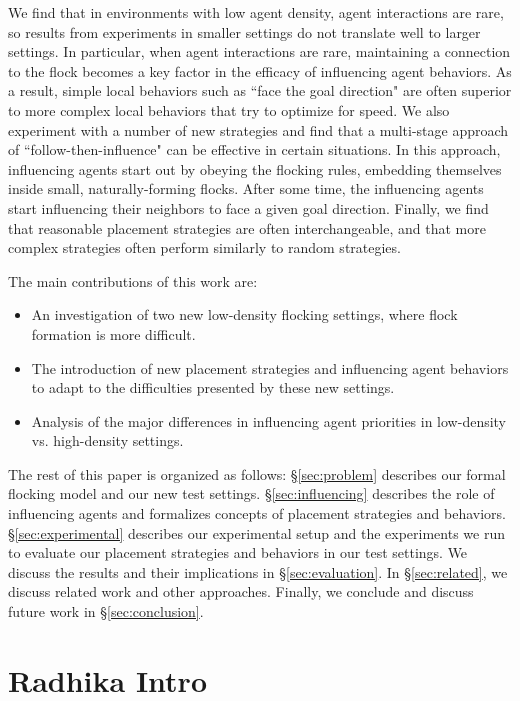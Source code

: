 We find that in environments with low agent density, agent interactions are rare,
so results from experiments in smaller settings do not translate well to larger
settings.
In particular, when agent interactions are rare, maintaining a connection to
the flock becomes a key factor in the efficacy of influencing agent behaviors.
As a result, simple local behaviors such as ``face the goal direction" are
often superior to more complex local behaviors that try to optimize for speed.
We also experiment with a number of new strategies and find that a multi-stage 
approach of ``follow-then-influence" can be effective in certain 
situations.
In this approach, influencing agents start out by obeying the flocking rules,
embedding themselves inside small, naturally-forming flocks.
After some time, the influencing agents start influencing their neighbors to
face a given goal direction.
Finally, we find that reasonable placement strategies are often 
interchangeable, and that more complex strategies often perform similarly to 
random strategies.

The main contributions of this work are:
\begin{itemize}
    \item An investigation of two new low-density flocking settings, where
    flock formation is more difficult.
    \item The introduction of new placement strategies and influencing agent
    behaviors to adapt to the difficulties presented by these new settings.
    \item Analysis of the major differences in influencing agent priorities in
    low-density vs. high-density settings.
\end{itemize}

The rest of this paper is organized as follows: \S\ref{sec:problem} describes 
our formal flocking model and our new test settings. \S\ref{sec:influencing} 
describes the role of influencing agents and formalizes concepts of placement 
strategies and behaviors.
\S\ref{sec:experimental} describes our experimental setup and the experiments 
we run to evaluate our placement strategies and behaviors in our test settings.
We discuss the results and their implications in \S\ref{sec:evaluation}.
In \S\ref{sec:related}, we discuss related work and other approaches.
Finally, we conclude and discuss future work in \S\ref{sec:conclusion}.

\section{Radhika Intro}

